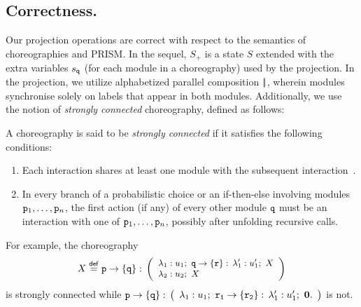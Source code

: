 \smallskip

\subsection{Correctness.} Our projection operations are correct with
respect to the semantics of choreographies and PRISM. In the sequel,
$S_+$ is a state $S$ extended with the extra variables $s_{\mathtt{q}}$
(for each module in a choreography) used by the projection. In the
projection, we utilize alphabetized parallel composition $|\!|$,
wherein modules synchronise solely on labels that appear in both
modules.
Additionally, we use the notion of {\em strongly connected} choreography, defined as follows:

\begin{definition}
  A choreography is said to be \emph{strongly connected} if it satisfies the following conditions:
  \begin{enumerate}
      \item Each interaction shares at least one module with the subsequent interaction~\cite{CHY12}.
      \item In every branch of a probabilistic choice or an if-then-else involving modules $\mathtt{p}_1, \ldots, \mathtt{p}_n$, the first action (if any) of every other module $\mathtt{q}$ must be an interaction with one of $\mathtt{p}_1, \ldots, \mathtt{p}_n$, possibly after unfolding recursive calls.
  \end{enumerate}
\end{definition}

%
%
%

For example, the choreography
\begin{displaymath}\small
  X\stackrel{\mathsf{def}}{=} 
  \mathtt{p}\rightarrow \{\mathtt{q}\}:\,
  \left(
    \begin{array}{l}
      \lambda_1: u_1;\ \mathtt{q}\rightarrow \{\mathtt{r}\}:\, \lambda_1':u_1';\ X    \\
      \lambda_2: u_2;\ X
    \end{array}
  \right)
\end{displaymath}
%
is strongly connected while 
% 
$%
\interactBase{p}{q}:\,
\left(
  \begin{array}{l}
    \lambda_1: u_1;\ \interactBase{r_1}{r_2}:\, \lambda_1':u_1';\ \CEnd.
  \end{array}
\right) $ is not.
% 



